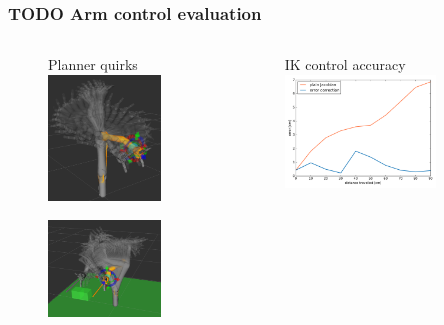 \documentclass{beamer}
\begin{document}
\begin{frame}
  \frametitle{TODO Arm control evaluation}
  \begin{columns}
    \begin{column}{.5\textwidth}
      \begin{figure}[ht]
        \centering
        Planner quirks
        \includegraphics[width=3cm]{wrong_plan_KDL.png}

        \includegraphics[width=3cm]{wrong_plan_close_obstacle.png}
      \end{figure}
    \end{column}
    \begin{column}{.5\textwidth}
      \begin{figure}[ht]
        \centering
      IK control accuracy
        \includegraphics[height=3cm]{jacob_error_real.pdf}
      \end{figure}
    \end{column}
  \end{columns}
\end{frame}
\end{document}
